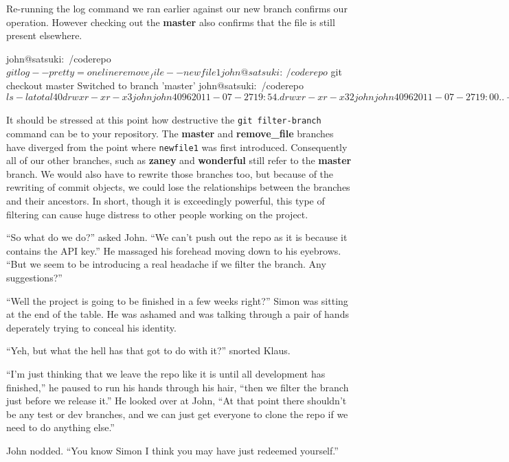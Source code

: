 Re-running the log command we ran earlier against our new branch confirms our operation.
However checking out the \textbf{master} also confirms that the file is still present elsewhere.

\begin{code}
john@satsuki:~/coderepo$ git log --pretty=oneline remove_file -- newfile1
john@satsuki:~/coderepo$ git checkout master
Switched to branch 'master'
john@satsuki:~/coderepo$ ls -la
total 40
drwxr-xr-x  3 john john 4096 2011-07-27 19:54 .
drwxr-xr-x 32 john john 4096 2011-07-27 19:00 ..
-rw-r--r--  1 john john   35 2011-07-22 07:15 another_file
-rw-r--r--  1 john john   25 2011-07-22 07:15 cont_dev
drwxrwxr-x  9 john john 4096 2011-07-27 19:54 .git
-rw-r--r--  1 john john   69 2011-07-27 19:54 newfile1
-rw-r--r--  1 john john   58 2011-07-22 07:15 newfile2
-rw-r--r--  1 john john   45 2011-07-22 07:15 newfile3
-rw-r--r--  1 john john    8 2011-03-31 22:15 temp_file
-rwxrwxr-x  1 john john  114 2011-07-21 21:17 test.sh
john@satsuki:~/coderepo$
\end{code}

It should be stressed at this point how destructive the \texttt{git filter-branch} command can be to your repository.
The \textbf{master} and \textbf{remove\_file} branches have diverged from the point where \texttt{newfile1} was first introduced.
Consequently all of our other branches, such as \textbf{zaney} and \textbf{wonderful} still refer to the \textbf{master} branch.
We would also have to rewrite those branches too, but because of the rewriting of commit objects, we could lose the relationships between the branches and their ancestors.
In short, though it is exceedingly powerful, this type of filtering can cause huge distress to other people working on the project.

\begin{trenches}
``So what do we do?'' asked John.
``We can't push out the repo as it is because it contains the API key.''
He massaged his forehead moving down to his eyebrows.
``But we seem to be introducing a real headache if we filter the branch. Any suggestions?''

``Well the project is going to be finished in a few weeks right?'' Simon was sitting at the end of the table.
He was ashamed and was talking through a pair of hands deperately trying to conceal his identity.

``Yeh, but what the hell has that got to do with it?'' snorted Klaus.

``I'm just thinking that we leave the repo like it is until all development has finished,'' he paused to run his hands through his hair,
``then we filter the branch just before we release it.''
He looked over at John, ``At that point there shouldn't be any test or dev branches, and we can just get everyone to clone the repo if we need to do anything else.''

John nodded.  ``You know Simon I think you may have just redeemed yourself.''
\end{trenches}

